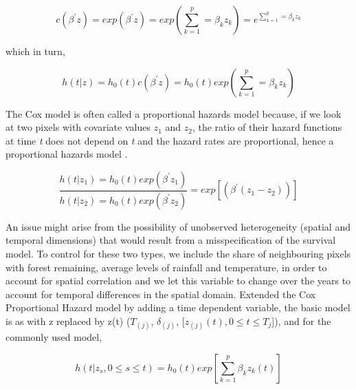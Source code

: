 \begin{center}
\begin{equation}
c(\beta^{'}z) = exp(\beta^{'}z) = exp(\sum^{p}_{k=1}=\beta_{k}z_{k}) = e^{\sum^{p}_{k=1}=\beta_{k}z_{k}}  \label{eq:5} 
\end{equation}
\end{center}

which in turn, 

\begin{center}
\begin{equation}
h(t|z) = h_{0}(t)c(\beta^{'}z) = h_{0}(t) exp(\sum^{p}_{k=1}=\beta_{k}z_{k}) \label{eq:6} 
\end{equation}
\end{center}

The Cox model is often called a proportional hazards model because, if we look at two pixels with covariate values $z_{1}$ and $z_{2}$, the ratio of their hazard functions at time \textit{t} does not depend on \textit{t} and the hazard rates are proportional, hence a proportional hazards model \citep{cao_2005}.

\begin{center}
\begin{equation}
\frac{h(t|z_{1}) = h_{0}(t)exp(\beta^{'}z_{1})}{h(t|z_{2}) = h_{0}(t)exp(\beta^{'}z_{2})} = exp[(\beta^{'}(z_{1} - z_{2}))]  \label{eq:7} 
\end{equation}
\end{center}


An issue might arise from the possibility of unobserved heterogeneity (spatial and temporal dimensions) that would result from a misspecification of the survival model. To control for these two types, we include the share of neighbouring pixels with forest remaining, average levels of rainfall and temperature, in order to account for spatial correlation and we let this variable to change over the years to account for temporal differences in the spatial domain. Extended the Cox Proportional Hazard model by adding a time dependent variable, the basic model is as with z replaced by z(t) ($T_{(j)}$, $\delta_{(j)}$, [$z_{(j)}(t), 0 \leq t \leq T_{j}$]), and for the
commonly used model,

\begin{center}
\begin{equation}
h(t|z_{s}, 0 \leq s \leq t) = h_{0}(t)exp[\sum^{p}_{k=1}\beta_{k}z_{k}(t)] \label{eq:8} 
\end{equation}
\end{center}

